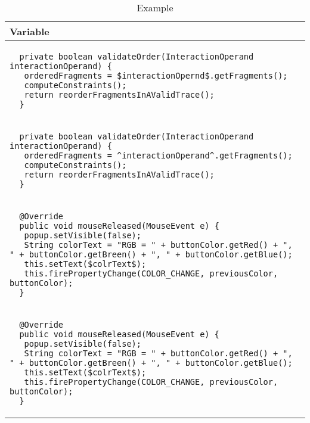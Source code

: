 \begin{table}[p]
\begin{tabular}{ | m{11cm} | }
  \hline
  Variable \\
  \hline
  \begin{lstlisting}
  private boolean validateOrder(InteractionOperand interactionOperand) {
   orderedFragments = $interactionOpernd$.getFragments();
   computeConstraints();
   return reorderFragmentsInAValidTrace();
  }
  \end{lstlisting} \\
  \begin{lstlisting}
  private boolean validateOrder(InteractionOperand interactionOperand) {
   orderedFragments = ^interactionOperand^.getFragments();
   computeConstraints();
   return reorderFragmentsInAValidTrace();
  }
  \end{lstlisting} \\
  \hline
  \hline
  \begin{lstlisting}
  @Override
  public void mouseReleased(MouseEvent e) {
   popup.setVisible(false);
   String colorText = "RGB = " + buttonColor.getRed() + ", " + buttonColor.getBreen() + ", " + buttonColor.getBlue();
   this.setText($colrText$);
   this.firePropertyChange(COLOR_CHANGE, previousColor, buttonColor);
  }
  \end{lstlisting} \\
  \begin{lstlisting}
  @Override
  public void mouseReleased(MouseEvent e) {
   popup.setVisible(false);
   String colorText = "RGB = " + buttonColor.getRed() + ", " + buttonColor.getBreen() + ", " + buttonColor.getBlue();
   this.setText($colrText$);
   this.firePropertyChange(COLOR_CHANGE, previousColor, buttonColor);
  }
  \end{lstlisting} \\
  \hline
\end{tabular}
\caption{Example}
\label{variable_showcase_table}
\end{table}

